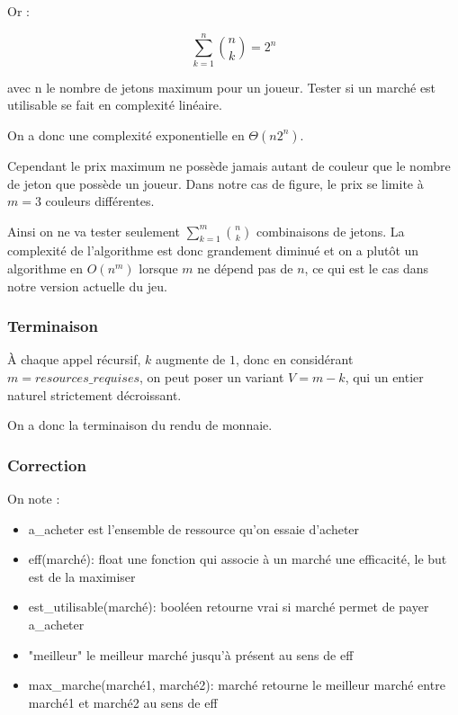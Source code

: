 Or :

\begin{equation}
    \sum_{k=1}^{n} \binom{n}{k} = 2^n
\end{equation}

avec n le nombre de jetons maximum pour un joueur. Tester si un marché est utilisable se fait en complexité linéaire.

On a donc une complexité exponentielle en $\Theta(n2^n)$.
\begin{summary}
Cependant le prix maximum ne possède jamais autant de couleur que le nombre de jeton que possède un joueur. Dans notre cas de figure, le prix se limite à $m = 3$ couleurs différentes.

Ainsi on ne va tester seulement $\displaystyle \sum_{k=1}^{m} \binom{n}{k}$ combinaisons de jetons. La complexité de l'algorithme est donc grandement diminué et on a plutôt un algorithme en $O(n^m)$ lorsque $m$ ne dépend pas de $n$, ce qui est le cas dans notre version actuelle du jeu.
\end{summary}

\subsubsection*{Terminaison}

À chaque appel récursif, $k$ augmente de $1$, donc en considérant $m = resources\_requises$, on peut poser un variant $V = m - k$, qui un entier naturel strictement décroissant.

On a donc la terminaison du rendu de monnaie.

\subsubsection*{Correction}

On note :

\begin{itemize}
    \item a\_acheter est l'ensemble de ressource qu'on essaie d'acheter
    \item eff(marché): float une fonction qui associe à un marché une efficacité, le but est de la maximiser
    \item est\_utilisable(marché): booléen retourne vrai si marché permet de payer a\_acheter
    \item "meilleur" le meilleur marché jusqu'à présent au sens de eff
    \item max\_marche(marché1, marché2): marché retourne le meilleur marché entre marché1 et marché2 au sens de eff
\end{itemize}
 

